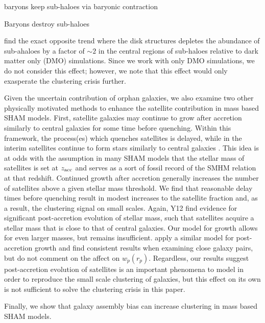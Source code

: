 \documentclass[a4paper,fleqn,usenatbib]{mnras}
\begin{document}
baryons keep sub-haloes via baryonic contraction \citep{Fiacconi:2016ba}

  Baryons destroy sub-haloes \citep{Brooks:2014jv} \citep{Read:2006da, Read:2006hw} \citep{GarrisonKimmel:2017cv} \citep{Wetzel:2016iy} \citep{Despali:2016uv}

    \citep{GarrisonKimmel:2017tu} find the exact opposite trend where the disk structures depletes the abundance of sub-ahaloes by a factor of $\sim 2$ in the central regions of sub-haloes relative to dark matter only (DMO) simulations.  Since we work with only DMO simulations, we do not consider this effect; however, we note that this effect would only exasperate the clustering crisis further.      

Given the uncertain contribution of orphan galaxies, we also examine two other physically motivated methods to enhance the satellite contribution in mass based SHAM models.  First, satellite galaxies may continue to grow after accretion similarly to central galaxies for some time before quenching.  Within this framework, the process(es) which quenches satellites is delayed, while in the interim satellites continue to form stars similarly to central galaxies \citep{Wetzel:2013dw}.  This idea is at odds with the assumption in many SHAM models that the stellar mass of satellites is set at $z_{\rm acc}$ and serves as a sort of fossil record of the SMHM relation at that redshift.  Continued growth after accretion generally increases the number of satellites above a given stellar mass threshold.  We find that reasonable delay times before quenching result in modest increases to the satellite fraction and, as a result, the clustering signal on small scales.  Again, Y12 find evidence for significant post-accretion evolution of stellar mass, such that satellites acquire a stellar mass that is close to that of central galaxies.  Our model for growth allows for even larger masses, but remains insufficient.  \citep{Behroozi:2015wx} apply a similar model for post-accretion growth and find consistent results when examining close galaxy pairs, but do not comment on the affect on $w_p(r_p)$.  Regardless, our results suggest post-accretion evolution of satellites is an important phenomena to model in order to reproduce the small scale clustering of galaxies, but this effect on its own is not sufficient to solve the clustering crisis in this paper.           

Finally, we show that galaxy assembly bias can increase clustering in mass based SHAM models.
\end{document}
